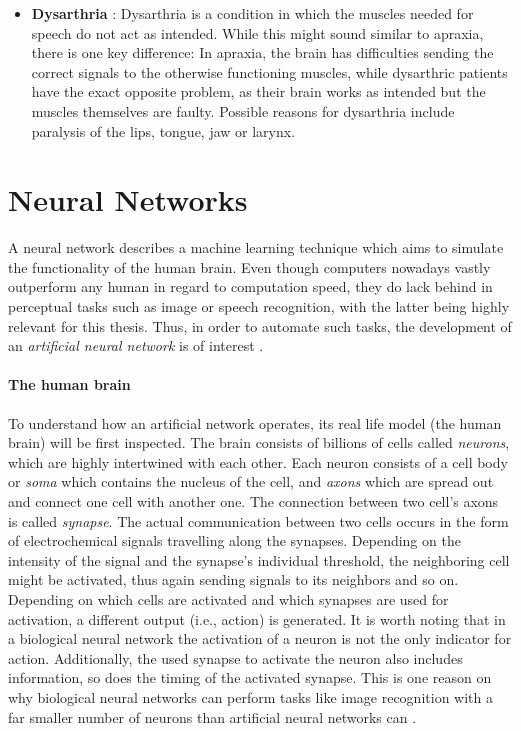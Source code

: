 \documentclass[draft,final]{vutinfth} %
\begin{document}
\begin{itemize}
\item \textbf{Dysarthria} \cite{balaji2015speech}: Dysarthria is a condition in which the muscles needed for speech do not act as intended. While this might sound similar to apraxia, there is one key difference: In apraxia, the brain has difficulties sending the correct signals to the otherwise functioning muscles, while dysarthric patients have the exact opposite problem, as their brain works as intended but the muscles themselves are faulty. Possible reasons for dysarthria include paralysis of the lips, tongue, jaw or larynx.
\end{itemize}
\section{Neural Networks}
A neural network describes a machine learning technique which aims to simulate the functionality of the human brain. Even though computers nowadays vastly outperform any human in regard to computation speed, they do lack behind in perceptual tasks such as image or speech recognition, with the latter being highly relevant for this thesis. Thus, in order to automate such tasks, the development of an \emph{artificial neural network} is of interest \cite{zou2009overview}. \\

\paragraph{The human brain} To understand how an artificial network operates, its real life model (the human brain) will be first inspected. The brain consists of billions of cells called \emph{neurons}, which are highly intertwined with each other. Each neuron consists of a cell body or \emph{soma} which contains the nucleus of the cell, and \emph{axons} which are spread out and connect one cell with another one. The connection between two cell's axons is called \emph{synapse}. The actual communication between two cells occurs in the form of electrochemical signals travelling along the synapses. Depending on the intensity of the signal and the synapse's individual threshold, the neighboring cell might be activated, thus again sending signals to its neighbors and so on. Depending on which cells are activated and which synapses are used for activation, a different output (i.e., action) is generated.  
It is worth noting that in a biological neural network the activation of a neuron is not the only indicator for action. Additionally, the used synapse to activate the neuron also includes information, so does the timing of the activated synapse. This is one reason on why biological neural networks can perform tasks like image recognition with a far smaller number of neurons than artificial neural networks can \cite{zou2009overview}.  
\end{document}
